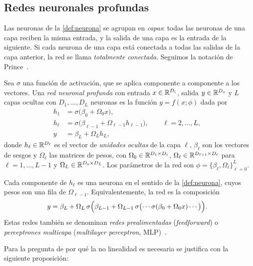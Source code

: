 \subsection{Redes neuronales profundas}\label{sec:mlp}

Las neuronas de la \cref{def:neurona} se agrupan en \emph{capas}: todas las neuronas
de una capa reciben la misma entrada, y la salida de una capa es la entrada de la
siguiente. Si cada neurona de una capa está conectada a todas las salidas de la
capa anterior, la red se llama \emph{totalmente conectada}. Seguimos la notación
de Prince~\cite[sec.~4.4.1]{prince2023understanding}.

\begin{definicion}\label{def:mlp}
Sea $\sigma$ una función de activación, que se aplica componente a componente a
los vectores. Una \emph{red neuronal profunda} con entrada $x\in\mathbb{R}^{D_i}$, salida
$y\in\mathbb{R}^{D_o}$ y $L$ capas ocultas con $D_1,\dots,D_L$ neuronas es la función
$y = f(x;\phi)$ dada por
\begin{align*}
  h_1 &= \sigma\bigl(\beta_0 + \Omega_0 x\bigr),\\
  h_\ell &= \sigma\bigl(\beta_{\ell-1} + \Omega_{\ell-1} h_{\ell-1}\bigr), \qquad \ell = 2,\dots,L,\\
  y   &= \beta_L + \Omega_L h_L,
\end{align*}
donde $h_\ell\in\mathbb{R}^{D_\ell}$ es el vector de \emph{unidades ocultas} de la capa $\ell$,
$\beta_\ell$ son los vectores de sesgos y $\Omega_\ell$ las matrices de pesos, con
$\Omega_0\in\mathbb{R}^{D_1\times D_i}$, $\Omega_\ell\in\mathbb{R}^{D_{\ell+1}\times D_\ell}$ para
$\ell = 1,\dots,L-1$ y $\Omega_L\in\mathbb{R}^{D_o\times D_L}$. Los parámetros de la red son
$\phi = \{\beta_\ell, \Omega_\ell\}_{\ell=0}^{L}$.
\end{definicion}

Cada componente de $h_\ell$ es una neurona en el sentido de la \cref{def:neurona},
cuyos pesos son una fila de $\Omega_{\ell-1}$. Equivalentemente, la red es la
composición
\[
  y = \beta_L + \Omega_L\,\sigma\Bigl(\beta_{L-1} + \Omega_{L-1}\,\sigma\bigl(\cdots
      \sigma(\beta_0 + \Omega_0 x)\cdots\bigr)\Bigr).
\]
Estas redes también se denominan \emph{redes prealimentadas} (\emph{feedforward})
o \emph{perceptrones multicapa} (\emph{multilayer perceptron},
MLP)~\cite[cap.~6]{goodfellow2016deep}.

Para la pregunta de por qué la no linealidad es necesaria se justifica con la siguiente proposición:

